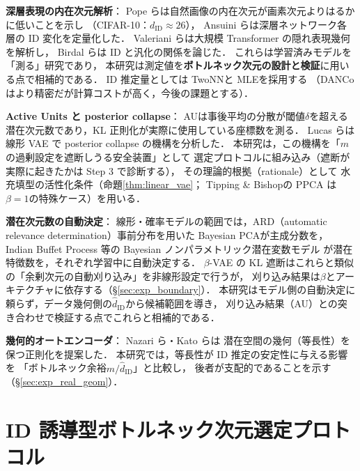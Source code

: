 \documentclass[11pt,a4paper]{jsarticle}
\newcommand{\dID}{d_{\mathrm{ID}}}
\newcommand{\hatdID}{\hat{d}_{\mathrm{ID}}}
\begin{document}
\textbf{深層表現の内在次元解析}：
Pope ら\cite{pope2021intrinsic}は自然画像の内在次元が画素次元よりはるかに低いことを示し
（CIFAR-10：$\dID \approx 26$），
Ansuini ら\cite{ansuini2019intrinsic}は深層ネットワーク各層の ID 変化を定量化した．
Valeriani ら\cite{valeriani2023geometry}は大規模 Transformer の隠れ表現幾何を解析し，
Birdal ら\cite{birdal2021intrinsic}は ID と汎化の関係を論じた．
これらは学習済みモデルを「測る」研究であり，
本研究は測定値を\textbf{ボトルネック次元の設計と検証}に用いる点で相補的である．
ID 推定量としては TwoNN\cite{facco2017twonn}と MLE\cite{levina2005mle}を採用する
（DANCo\cite{ceruti2014danco}はより精密だが計算コストが高く，今後の課題とする）．

\textbf{Active Units と posterior collapse}：
AU\cite{higgins2017betavae,lucas2019elbo}は事後平均の分散が閾値$\delta$を超える
潜在次元数であり，KL 正則化が実際に使用している座標数を測る．
Lucas ら\cite{lucas2019elbo}は線形 VAE で posterior collapse の機構を分析した．
本研究は，この機構を「$m$の過剰設定を遮断しうる安全装置」として
選定プロトコルに組み込み（遮断が実際に起きたかは Step 3 で診断する），
その理論的根拠（rationale）として
水充填型の活性化条件（命題\ref{thm:linear_vae}；
Tipping \& Bishop\cite{tippingbishop1999ppca}の PPCA は$\beta=1$の特殊ケース）を用いる．

\textbf{潜在次元数の自動決定}：
線形・確率モデルの範囲では，ARD（automatic relevance determination）事前分布を用いた
Bayesian PCA\cite{bishop1999bayesian}が主成分数を，
Indian Buffet Process 等の Bayesian ノンパラメトリック潜在変数モデル
\cite{ghahramani2005infinite}が潜在特徴数を，それぞれ学習中に自動決定する．
$\beta$-VAE の KL 遮断はこれらと類似の「余剰次元の自動刈り込み」を非線形設定で行うが，
刈り込み結果は$\beta$とアーキテクチャに依存する（§\ref{sec:exp_boundary}）．
本研究はモデル側の自動決定に頼らず，データ幾何側の$\hatdID$から候補範囲を導き，
刈り込み結果（AU）との突き合わせで検証する点でこれらと相補的である．

\textbf{幾何的オートエンコーダ}：
Nazari ら\cite{nazari2023geometric}・Kato ら\cite{kato2020rdae}は
潜在空間の幾何（等長性）を保つ正則化を提案した．
本研究では，等長性が ID 推定の安定性に与える影響を
「ボトルネック余裕$m / \hatdID$」と比較し，
後者が支配的であることを示す（§\ref{sec:exp_real_geom}）．

\section{ID 誘導型ボトルネック次元選定プロトコル}\label{sec:protocol}
\end{document}
